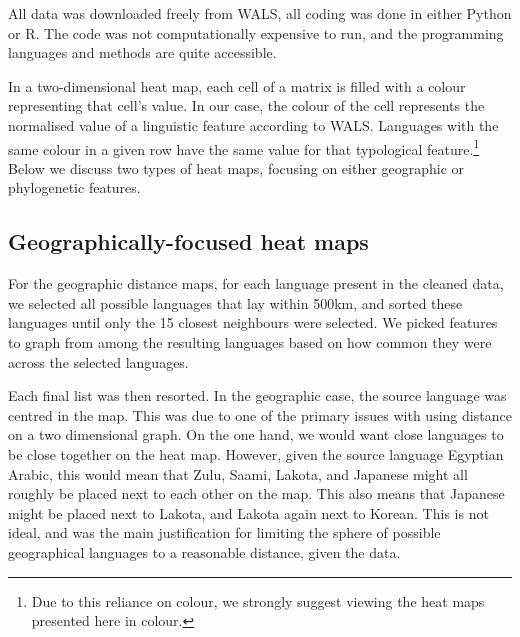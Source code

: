 \documentclass[11pt]{article}
\begin{document}
All data was downloaded freely from WALS, all coding was done in either Python or R. The code was not computationally expensive to run, and the programming languages and methods are quite accessible. 

In a two-dimensional heat map, each cell of a matrix is filled with a colour representing that cell's value. In our case, the colour of the cell represents the normalised value of a linguistic feature according to WALS. Languages with the same colour in a given row have the same value for that typological feature.\footnote{Due to this reliance on colour, we strongly suggest viewing the heat maps presented here in colour.} Below we discuss two types of heat maps, focusing on either geographic or phylogenetic features.

\subsection{Geographically-focused heat maps}
For the geographic distance maps, for each language present in the cleaned data, we selected all possible languages that lay within 500km, and sorted these languages until only the 15 closest neighbours were selected. We picked features to graph from among the resulting languages based on how common they were across the selected languages. 

Each final list was then resorted. In the geographic case, the source language was centred in the map. This was due to one of the primary issues with using distance on a two dimensional graph. On the one hand, we would want close languages to be close together on the heat map. However, given the source language Egyptian Arabic, this would mean that Zulu, Saami, Lakota, and Japanese might all roughly be placed next to each other on the map. This also means that Japanese might be placed next to Lakota, and Lakota again next to Korean. This is not ideal, and was the main justification for limiting the sphere of possible geographical languages to a reasonable distance, given the data.
\end{document}
